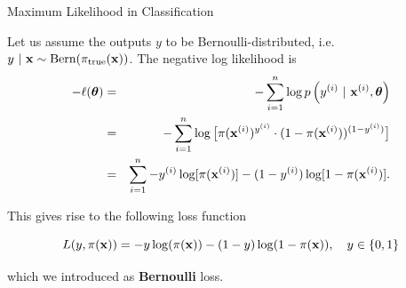 \documentclass[11pt,compress,t,notes=noshow, xcolor=table]{beamer}
\begin{document}
\begin{vbframe}{Maximum Likelihood in Classification}

Let us assume the outputs $y$ to be Bernoulli-distributed, i.e. $y ~|~ \mathbf{x} \sim \text{Bern}(\pi_\text{true}(\mathbf{x}))$. 
The negative log likelihood is
\begin{eqnarray*}
- \ell(\bm{\theta}) &=& -\sum\limits_{i=1}^n \log p\left(y^{(i)} ~|~\mathbf{x}^{(i)}, \bm{\theta}\right) \\ 
&=& - \sum\limits_{i=1}^n \log \big[\pi(\mathbf{x}^{(i)})^{y^{(i)}} \cdot (1 - \pi(\mathbf{x}^{(i)}))^{(1 - y^{(i)})} \big]\\
&=& \sum\limits_{i=1}^n -y^{(i)} \log[\pi(\mathbf{x}^{(i)})] - (1-y^{(i)}) \log [1 - \pi(\mathbf{x}^{(i)})]. 
\end{eqnarray*}



This gives rise to the following loss function 

$$
  L(y, \pi(\mathbf{x})) = -y\log(\pi(\mathbf{x}))-(1-y)\log(1-\pi(\mathbf{x})), \quad y \in \{0, 1\}
$$

which we introduced as \textbf{Bernoulli} loss. 













\end{vbframe}
\end{document}
